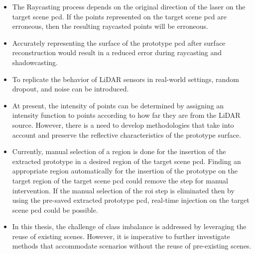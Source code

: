 \begin{itemize}
    \item The Raycasting process depends on the original direction of the laser on the target scene \acrshort{pcd}. If the points represented on the target scene \acrshort{pcd} are erroneous, then the resulting raycasted points will be erroneous.
    \item Accurately representing the surface of the prototype \acrshort{pcd} after surface reconstruction would result in a reduced error during raycasting and shadowcasting.
    \item To replicate the behavior of LiDAR sensors in real-world settings, random dropout, and noise can be introduced.
    \item At present, the intensity of points can be determined by assigning an intensity function to points according to how far they are from the LiDAR source. However, there is a need to develop methodologies that take into account and preserve the reflective characteristics of the prototype surface.
    \item Currently, manual selection of a region is done for the insertion of the extracted prototype in a desired region of the target scene \acrshort{pcd}. Finding an appropriate region automatically for the insertion of the prototype on the target region of the target scene \acrshort{pcd} could remove the step for manual intervention. If the manual selection of the \acrshort{roi} step is eliminated then by using the pre-saved extracted prototype \acrshort{pcd}, real-time injection on the target scene \acrshort{pcd} could be possible.
    \item In this thesis, the challenge of class imbalance is addressed by leveraging the reuse of existing scenes. However, it is imperative to further investigate methods that accommodate scenarios without the reuse of pre-existing scenes.
\end{itemize}

